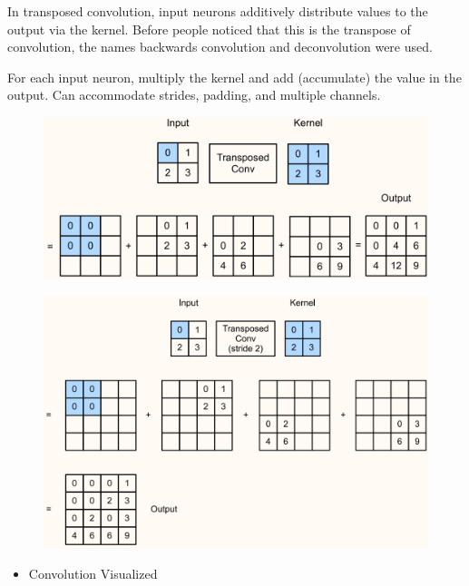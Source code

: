 \begin{definition}
    In transposed convolution, input neurons additively distribute values to the output via the kernel.
    Before people noticed that this is the transpose of convolution, the names backwards convolution and deconvolution were used.

    For each input neuron, multiply the kernel and add (accumulate) the value in the output.
    Can accommodate strides, padding, and multiple channels.

    \begin{figure}[H]
        \centering
        \includegraphics[width=1.0\textwidth]{.././assets/8.13.png}
    \end{figure}

    \begin{figure}[H]
        \centering
        \includegraphics[width=1.0\textwidth]{.././assets/8.14.png}
    \end{figure}
\end{definition}

\begin{itemize}
    \item Convolution Visualized
\end{itemize}


